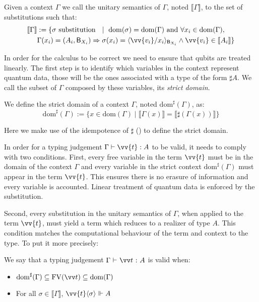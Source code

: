 \documentclass[runningheads,orivec,envcountsame,envcountsect]{llncs}
\newcommand\ansubst[2]{\ensuremath{\langle #1 \rangle_{#2}}}
\newcommand\dom[1]{\mathrm{dom}(#1)}
\newcommand\sdom[1]{\mathrm{dom}^{\sharp}(#1)}
\newcommand\FV[1]{\mathrm{FV}(#1)}
\def\sem#1{\llbracket#1\rrbracket}
\def\TYP#1#2#3{#1~{\vdash}~#2~{:}~#3}
\def\real{\Vdash}
\newcommand\basis[1]{\ensuremath{\mathsf{B}_{#1}}}
\begin{document}
\begin{definition}
    Given a context $\Gamma$ we call the unitary semantics of $\Gamma$, noted $\sem{\Gamma}$, to the set of substitutions such that:
    \begin{align*}
      \sem{\Gamma} &:= 
      \{\sigma\text{ substitution }~\mid~ \dom{\sigma} = \dom{\Gamma}\text{ and } \forall {x_i} \in\dom{\Gamma},\\
      &\Gamma(x_i) = (A_i, \basis{X_i})\Rightarrow \sigma(x_i)=\ansubst{\vv{v_i}/x_i}{\basis{X_i}} \land \vv{v_i}\in\sem{A_i}\}
    \end{align*}
\end{definition}

In order for the calculus to be correct we need to ensure that qubits are treated linearly. The first step is to identify which variables in the context represent quantum data, those will be the ones associated with a type of the form $\sharp A$. We call the subset of $\Gamma$ composed by these variables, its \emph{strict domain}. 

\begin{definition}
    We define the strict domain of a context $\Gamma$, noted $\sdom{\Gamma}$, as:
    \[
    \sdom{\Gamma} := \{x\in\dom{\Gamma} \mid \sem{\Gamma(x)}=\sem{\sharp(\Gamma(x))}\}
    \]
\end{definition}

Here we make use of the idempotence of $\sharp$ () to define the strict domain. 

In order for a typing judgement $\Gamma\vdash \vv{t}: A$ to be valid, it needs to comply with two conditions. First, every free variable in the term $\vv{t}$ must be in the domain of the context $\Gamma$ and every variable in the strict context $\sdom{\Gamma}$ must appear in the term $\vv{t}$. This ensures there is no erasure of information and every variable is accounted. Linear treatment of quantum data is enforced by the substitution.

Second, every substitution in the unitary semantics of $\Gamma$, when applied to the term $\vv{t}$, must yield a term which reduces to a realizer of type $A$. This condition matches the computational behaviour of the term and context to the type. To put it more precisely: 

\begin{definition}
    We say that a typing judgement $\TYP{\Gamma}{\vv t}{A}$ is valid when:
    \begin{itemize}
        \item $\sdom{\Gamma}\subseteq\FV{\vv t}\subseteq \dom{\Gamma}$
        \item For all $\sigma\in\sem\Gamma$, $\vv{t}\ansubst{\sigma}{}\real A$
    \end{itemize}
\end{definition}
\end{document}
